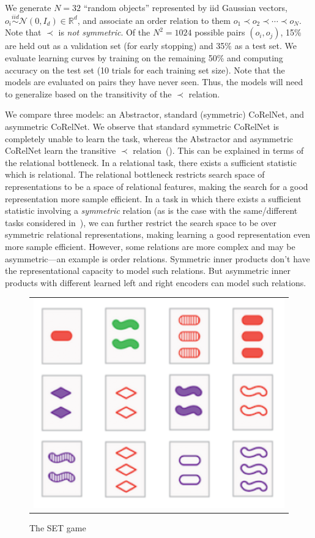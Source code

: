 We generate $N = 32$ ``random objects'' represented by iid Gaussian vectors, $o_i \overset{iid}{\sim} \mathcal{N}(0,
I_d) \in \mathbb{R}^d$, and associate an order relation to them $o_1 \prec o_2 \prec \cdots \prec o_N$. Note that $\prec$ is \textit{not symmetric}. Of the $N^2 = 1024$ possible pairs $(o_i, o_j)$, 15\% are held out as a validation set (for early stopping) and 35\% as a test set. We evaluate learning curves by training on the remaining 50\% and computing accuracy on the test set (10 trials for each training set size). Note that the models are evaluated on pairs they have never seen. Thus, the models will need to generalize based on the transitivity of the $\prec$ relation.

We compare three models: an Abstractor, standard (symmetric) CoRelNet, and asymmetric CoRelNet. We observe that standard symmetric CoRelNet is completely unable to learn the task, whereas the Abstractor and asymmetric CoRelNet learn the transitive $\prec$ relation~(). This can be explained in terms of the relational bottleneck. In a relational task, there exists a sufficient statistic which is relational. The relational bottleneck restricts search space of representations to be a space of relational features, making the search for a good representation more sample efficient. In a task in which there exists a sufficient statistic involving a \textit{symmetric} relation (as is the case with the same/different tasks considered in~\citep{kerg2022neural}), we can further restrict the search space to be over symmetric relational representations, making learning a good representation even more sample efficient.
However, some relations are more complex and may be asymmetric---an example is order relations. Symmetric inner products don't have the representational capacity to model such relations. But asymmetric inner products with different learned left and right encoders can model such relations.



\begin{figure}
	\vskip-5pt
	\begin{tabular}{c}
		\includegraphics[width=.25\textwidth]{figures/set_example}\\[-5pt]
	\end{tabular}
	\caption{\footnotesize The SET game}\label{fig:set_example}
\end{figure}
